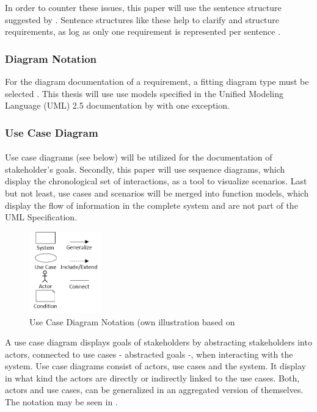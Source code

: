 In order to counter these issues, this paper will use the sentence structure suggested by \textcites[107]{Ebert.2014}[246]{Pohl.2007}. Sentence structures like these help to clarify and structure requirements, as log as only one requirement is represented per sentence \parencite[107]{Ebert.2014}. 


\subsubsection{Diagram Notation}
For the diagram documentation of a requirement, a fitting diagram type must be selected \textcite[299]{Pohl.2007}.  This thesis will use use models specified in the Unified Modeling Language (UML) 2.5 documentation by \textcite{ObjectManagementGroup.01.03.2015} with one exception. 


\subsubsection{Use Case Diagram}

\paragraph{\label{par:useCaes}}
Use case diagrams (see below) will be utilized for the documentation of stakeholder's goals. Secondly, this paper will use sequence diagrams, which display the chronological set of interactions, as a tool to visualize scenarios. Last but not least, use cases and scenarios will be merged into function models, which display the flow of information in the complete system and are not part of the UML Specification. 

\begin{figure}[H] 
    \centering
    \includegraphics[width=0.28\textwidth]{img/ucSymb.png}
    \caption{Use Case Diagram Notation (own illustration based on \cite[163]{Pohl.2007}}\label{fig:ucSymb}
\end{figure}

A use case diagram displays goals of stakeholders by abstracting stakeholders into actors, connected to use cases - abstracted goals -, when interacting with the system. Use case diagrams consist of actors, use cases and the system. It display in what kind the actors are directly or indirectly linked to the use cases. Both, actors and use cases, can be generalized in an aggregated version of themselves. The notation may be seen in .

